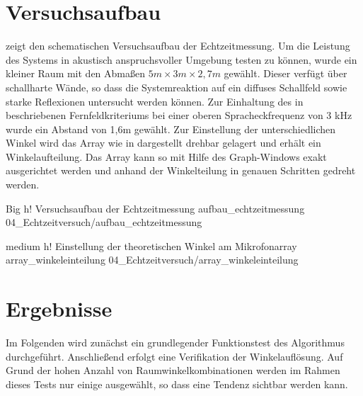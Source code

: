 \section{Versuchsaufbau}
\label{sec:Versuchsaufbau}
 zeigt den schematischen Versuchsaufbau der Echtzeitmessung. Um die Leistung des Systems in akustisch anspruchsvoller Umgebung testen zu können, wurde ein kleiner Raum mit den Abmaßen  $5m \times 3m \times 2,7m$ gewählt. Dieser verfügt über schallharte Wände, so dass die Systemreaktion auf ein diffuses Schallfeld sowie starke Reflexionen untersucht werden können. Zur Einhaltung des in  beschriebenen Fernfeldkriteriums bei einer oberen Spracheckfrequenz von 3 kHz wurde ein Abstand von 1,6m gewählt. Zur Einstellung der unterschiedlichen Winkel wird das Array wie in  dargestellt drehbar gelagert und erhält ein Winkelaufteilung. Das Array kann so mit Hilfe des \ccs Graph-Windows exakt ausgerichtet werden und anhand der Winkelteilung in genauen Schritten gedreht werden.


         {Big}                 %
         {h!}             %
         {Versuchsaufbau der Echtzeitmessung}                %
         {aufbau_echtzeitmessung}                %
         {04_Echtzeitversuch/aufbau_echtzeitmessung}     %





         {medium}                 %
         {h!}                     %
         {Einstellung der theoretischen Winkel am Mikrofonarray}                %
         {array_winkeleinteilung}                %
         {04_Echtzeitversuch/array_winkeleinteilung}     %



\section{Ergebnisse}
\label{sec:Ergebnisse}
Im Folgenden wird zunächst ein grundlegender Funktionstest des Algorithmus durchgeführt. Anschließend erfolgt eine Verifikation der Winkelauflösung. Auf Grund der hohen Anzahl von Raumwinkelkombinationen werden im Rahmen dieses Tests nur einige ausgewählt, so dass eine Tendenz sichtbar werden kann.




